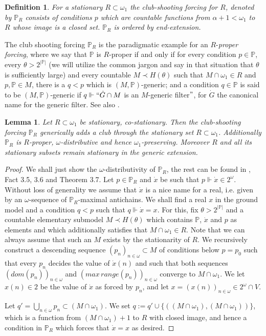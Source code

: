 \documentclass[a4paper,12pt]{article}
\newtheorem{lemma}[theorem]{Lemma}
\newtheorem{definition}[theorem]{Definition}
\newcommand{\forceP}{\mathbb{P}}
\begin{document}
\begin{definition}
 For a stationary $R \subset \omega_1$ the club-shooting forcing for $R$, denoted by $\forceP_R$ consists
 of conditions $p$ which are countable functions from $\alpha+1 <\omega_1$ to $R$ whose image is a closed set. $\forceP_R$ is ordered by end-extension.
 \end{definition}
The club shooting forcing $\forceP_R$ is the paradigmatic example for an $R$-\emph{proper forcing}, where we say that $\forceP$ is $R$-proper if and only if for every condition $p \in \forceP$, every $\theta > 2^{| \forceP|}$ (we will utilize the common jargon and say in that situation that $\theta$ is sufficiently large) and every countable $M \prec H(\theta)$ such that $M \cap \omega_1 \in R$ and $p, \forceP \in M$, there is a $q<p$ which is $(M, \forceP)$-generic; and a condition $q \in \forceP$ is said to be $(M,\forceP)$-generic if $q \Vdash ``\dot{G} \cap M$ is an $M$-generic filter$"$, for $\dot{G}$ the canonical name for the generic filter.  See also \cite{Goldstern}. 
\begin{lemma}
 Let $R\subset \omega_1$ be stationary, co-stationary. Then the club-shooting forcing $\forceP_R$ generically adds a club through the stationary set $R \subset \omega_1$. Additionally $\forceP_R$ is $R$-proper, $\omega$-distributive and
 hence $\omega_1$-preserving. Moreover $R$ and all its stationary subsets remain stationary in the generic extension. 
\end{lemma}
\begin{proof}
We shall just show the $\omega$-distributivity of $\forceP_R$, the rest can be found in \cite{Goldstern}, Fact 3.5, 3.6 and Theorem 3.7. Let $p \in \forceP_R$ and $\dot{x}$ be such that $p \Vdash \dot{x} \in 2^{\omega}$. Without loss of generality we assume that $\dot{x}$ is a nice name for a real, i.e. given by an $\omega$-sequence of $\forceP_R$-maximal antichains. We shall find a real $x$ in the ground model and a condition $q < p$ such that $q \Vdash \dot{x}=x$. For this, fix $\theta > 2^{|\forceP|}$ and a countable elementary submodel $M \prec H(\theta)$ which contains $\forceP$, $\dot{x}$ and $p$ as elements and which additionally satisfies that $M \cap \omega_1  \in R$. Note that we can always assume that such an $M$ exists by the stationarity of $R$. We recursively construct a descending sequence $(p_n)_{n \in \omega} \subset M$ of conditions below $p=p_0$ such that every $p_n$ decides the value of $\dot{x}(n)$ and such that both sequences $(dom(p_n))_{n \in \omega}$ and $(max \, range(p_n))_{n \in \omega}$  converge to $M \cap \omega_1$.
We let $x(n) \in 2$ be the value of $\dot{x}$ as forced by $p_n$, and let $x= (x(n))_{n \in \omega} \in 2^{\omega} \cap V$.

Let $q'=\bigcup_{n \in \omega} p_n \subset (M \cap \omega_1)$. We set $q:= q' \cup \{ ((M \cap \omega_1), (M \cap \omega_1)) \}$, which is a function from $(M \cap \omega_1)+1$ to $R$ with closed image, and hence a condition in $\forceP_R$ which forces that $\dot{x} =x$ as desired.

\end{proof}
\end{document}
